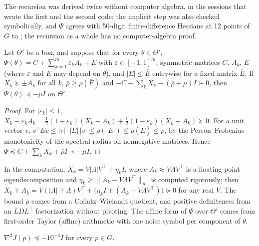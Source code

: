 The recursion was derived twice without computer algebra, in the sessions that wrote the first and the second code; the implicit step was also checked symbolically,
and $\Psi$ agrees with 50-digit finite-difference Hessians at 12 points of $G$ to ; the recursion as a whole has no computer-algebra proof.

\begin{lemma}\label{lem:pindyck-matrix}
Let $\Theta'$ be a box, and suppose that for every $\theta\in\Theta'$,
$\Psi(\theta)=C+\sum_{k=1}^m\varepsilon_kA_k+E$ with $\varepsilon\in[-1,1]^m$, symmetric matrices $C$, $A_k$, $E$ (where $\varepsilon$ and $E$ may depend on $\theta$), and $|E|\le\bar E$ entrywise for a fixed matrix $\bar E$.
If $X_k\succeq\pm A_k$ for all $k$, $\bar\rho\ge\rho(\bar E)$ and $-C-\sum_kX_k-(\bar\rho+\mu)I\succ0$, then $\Psi(\theta)\preceq-\mu I$ on $\Theta'$.
\end{lemma}

\begin{proof}
For $|\varepsilon_k|\le1$, $X_k-\varepsilon_kA_k=\tfrac12(1+\varepsilon_k)(X_k-A_k)+\tfrac12(1-\varepsilon_k)(X_k+A_k)\succeq0$.
For a unit vector $v$, $v^\top Ev\le|v|^\top|E|\,|v|\le\rho(|E|)\le\rho(\bar E)\le\bar\rho$, by the Perron--Frobenius monotonicity of the spectral radius on nonnegative matrices.
Hence $\Psi\preceq C+\sum_kX_k+\bar\rho I\prec-\mu I$.
\end{proof}

In the computation, $X_k=V|\Lambda|V^\top+\eta_kI$, where $A_k\approx V\Lambda V^\top$ is a floating-point eigendecomposition and $\eta_k\ge\|A_k-V\Lambda V^\top\|_\infty$ is computed rigorously;
then $X_k\mp A_k=V(|\Lambda|\mp\Lambda)V^\top+\bigl(\eta_kI\mp(A_k-V\Lambda V^\top)\bigr)\succeq0$ for any real $V$.
The bound $\bar\rho$ comes from a Collatz--Wielandt quotient, and positive definiteness from an $LDL^\top$ factorization without pivoting.
The affine form of $\Psi$ over $\Theta'$ comes from first-order Taylor (affine) arithmetic with one noise symbol per component of $\theta$.

\begin{theorem}\label{thm:pindyck-concave}
$\nabla^2J(p)\preceq-10^{-3}I$ for every $p\in G$.
\end{theorem}

